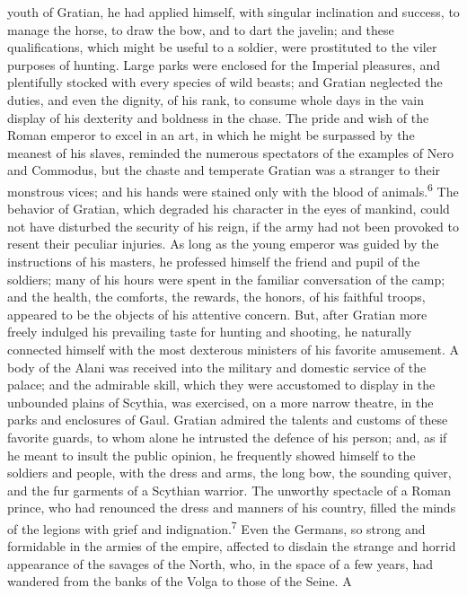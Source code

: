 youth of Gratian, he had applied himself, with singular
inclination and success, to manage the horse, to draw the bow,
and to dart the javelin; and these qualifications, which might be
useful to a soldier, were prostituted to the viler purposes of
hunting. Large parks were enclosed for the Imperial pleasures,
and plentifully stocked with every species of wild beasts; and
Gratian neglected the duties, and even the dignity, of his rank,
to consume whole days in the vain display of his dexterity and
boldness in the chase. The pride and wish of the Roman emperor to
excel in an art, in which he might be surpassed by the meanest of
his slaves, reminded the numerous spectators of the examples of
Nero and Commodus, but the chaste and temperate Gratian was a
stranger to their monstrous vices; and his hands were stained
only with the blood of animals.\textsuperscript{6} The behavior of Gratian, which
degraded his character in the eyes of mankind, could not have
disturbed the security of his reign, if the army had not been
provoked to resent their peculiar injuries. As long as the young
emperor was guided by the instructions of his masters, he
professed himself the friend and pupil of the soldiers; many of
his hours were spent in the familiar conversation of the camp;
and the health, the comforts, the rewards, the honors, of his
faithful troops, appeared to be the objects of his attentive
concern. But, after Gratian more freely indulged his prevailing
taste for hunting and shooting, he naturally connected himself
with the most dexterous ministers of his favorite amusement. A
body of the Alani was received into the military and domestic
service of the palace; and the admirable skill, which they were
accustomed to display in the unbounded plains of Scythia, was
exercised, on a more narrow theatre, in the parks and enclosures
of Gaul. Gratian admired the talents and customs of these
favorite guards, to whom alone he intrusted the defence of his
person; and, as if he meant to insult the public opinion, he
frequently showed himself to the soldiers and people, with the
dress and arms, the long bow, the sounding quiver, and the fur
garments of a Scythian warrior. The unworthy spectacle of a Roman
prince, who had renounced the dress and manners of his country,
filled the minds of the legions with grief and indignation.\textsuperscript{7}
Even the Germans, so strong and formidable in the armies of the
empire, affected to disdain the strange and horrid appearance of
the savages of the North, who, in the space of a few years, had
wandered from the banks of the Volga to those of the Seine. A
